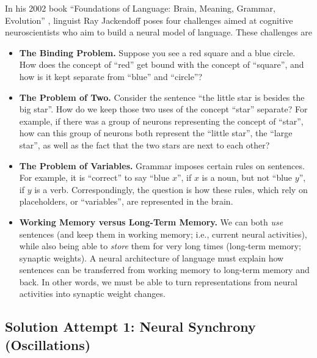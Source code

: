 \documentclass[10pt,letterpaper,oneside]{article}
\begin{document}
In his 2002 book \enquote{Foundations of Language: Brain, Meaning, Grammar, Evolution} \cite{jackendoff2002foundations}, linguist Ray Jackendoff poses four challenges aimed at cognitive neuroscientists who aim to build a neural model of language. These challenges are
\newcommand{\RS}{$\color{Crimson}\blacksquare$}
\newcommand{\BC}{$\color{RoyalBlue}\bullet$}
\begin{itemize}
	\item \textbf{The Binding Problem.} Suppose you see a red square and a blue circle. How does the concept of \enquote{red} get bound with the concept of \enquote{square}, and how is it kept separate from \enquote{blue} and \enquote{circle}?
	\item \textbf{The Problem of Two.} Consider the sentence \enquote{the little star is besides the big star}. How do we keep those two uses of the concept \enquote{star} separate? For example, if there was a group of neurons representing the concept of \enquote{star}, how can this group of neurons both represent the \enquote{little star}, the \enquote{large star}, as well as the fact that the two stars are next to each other?
	\item \textbf{The Problem of Variables.} Grammar imposes certain rules on sentences. For example, it is \enquote{correct} to say \enquote{blue $x$}, if $x$ is a noun, but not \enquote{blue $y$}, if $y$ is a verb. Correspondingly, the question is how these rules, which rely on placeholders, or \enquote{variables}, are represented in the brain.
	\item \textbf{Working Memory versus Long-Term Memory.} We can both \emph{use} sentences (and keep them in working memory; i.e., current neural activities), while also being able to \emph{store} them for very long times (long-term memory; synaptic weights). A neural architecture of language must explain how sentences can be transferred from working memory to long-term memory and back. In other words, we must be able to turn representations from neural activities into synaptic weight changes.
\end{itemize}

\subsection{Solution Attempt 1: Neural Synchrony (Oscillations)}
\end{document}

